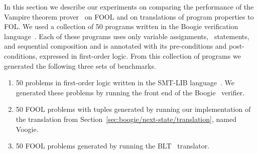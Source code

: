 
In this section we describe our experiments on comparing the performance of the Vampire theorem prover~\cite{Vampire13} on FOOL and on translations of program properties to FOL. We used a collection of 50 programs written in the Boogie verification language~\cite{leino2008boogie}. Each of these programs uses only variable assignments, \ITE\ statements, and sequential composition and is annotated with its pre-conditions and post-conditions, expressed in first-order logic. From this collection of programs we generated the following three sets of benchmarks.



\begin{enumerate}
  \item 50 problems in first-order logic written in the SMT-LIB language~\cite{SMT-LIB}. We generated these problems by running the front end of the Boogie~\cite{DBLP:conf/fmco/BarnettCDJL05} verifier.
  \item 50 FOOL problems with tuples generated by running our implementation of the translation from Section~\ref{sec:boogie/next-state/translation}, named Voogie.
  \item 50 FOOL problems generated by running the BLT~\cite{CF-iFM17} translator.
\end{enumerate}

